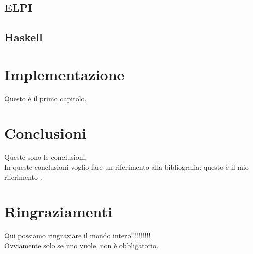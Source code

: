 \documentclass[12pt,a4paper,openright,twoside]{report}
\begin{document}
\section{ELPI}

\section{Haskell}

\clearpage{\pagestyle{empty}\cleardoublepage}	%


\chapter{Implementazione}		%

\lhead[\fancyplain{}{\bfseries\thepage}]{\fancyplain{}{\bfseries\rightmark}}	%

Questo \`e il primo capitolo.

\clearpage{\pagestyle{empty}\cleardoublepage}		%


\chapter{Conclusioni}		%


Queste sono le conclusioni.\\
In queste conclusioni voglio fare un riferimento alla bibliografia: questo \`e il mio riferimento \cite{K3,K4}.







\clearpage{\pagestyle{empty}\cleardoublepage}	%


\chapter*{Ringraziamenti}

\thispagestyle{empty}

Qui possiamo ringraziare il mondo intero!!!!!!!!!!\\
Ovviamente solo se uno vuole, non \`e obbligatorio.
\end{document}
